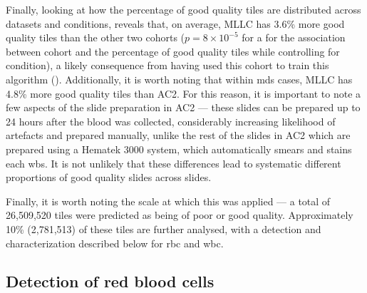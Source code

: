 \begin{figure}[!ht]
    \label{fig:sharpness-distribution}
\end{figure}

Finally, looking at how the percentage of good quality tiles are distributed across datasets and conditions, reveals that, on average, MLLC has 3.6\% more good quality tiles than the other two cohorts ($p = 8 \times 10^{-5}$ for a for the association between cohort and the percentage of good quality tiles while controlling for condition), a likely consequence from having used this cohort to train this algorithm (). Additionally, it is worth noting that within \ac{mds} cases, MLLC has 4.8\% more good quality tiles than AC2. For this reason, it is important to note a few aspects of the slide preparation in AC2 --- these slides can be prepared up to 24 hours after the blood was collected, considerably increasing likelihood of artefacts \cite{Bain2005-zg,Narasimha2008-fh} and prepared manually, unlike the rest of the slides in AC2 which are prepared using a Hematek 3000 system, which automatically smears and stains each \ac{wbs}. It is not unlikely that these differences lead to systematic different proportions of good quality slides across slides.

\begin{figure}[!ht]
    \label{fig:quality-percentage-distribution}
\end{figure}

Finally, it is worth noting the scale at which this was applied --- a total of 26,509,520 tiles were predicted as being of poor or good quality. Approximately 10\% (2,781,513) of these tiles are further analysed, with a detection and characterization described below for \ac{rbc} and \ac{wbc}.

\subsection{Detection of red blood cells}

